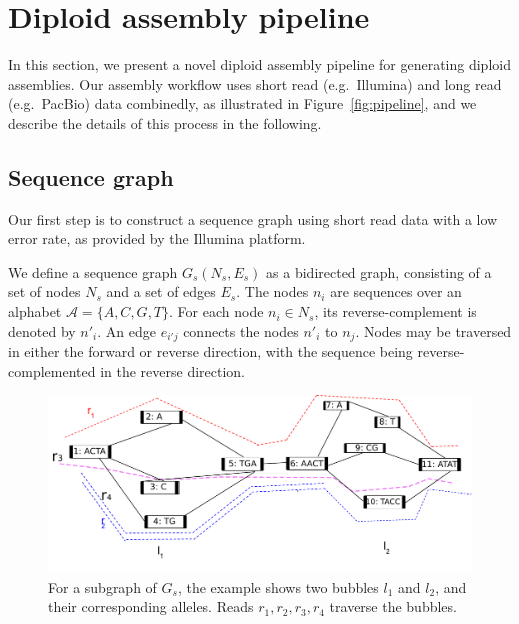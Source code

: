\section{Diploid assembly pipeline}
In this section, we present a novel diploid assembly pipeline for generating diploid assemblies.
Our assembly workflow uses short read (e.g.\ Illumina) and long read (e.g.\ PacBio) data combinedly, as illustrated in Figure~\ref{fig:pipeline}, and we describe the details of this process in the following.

\subsection{Sequence graph} 
Our first step is to construct a sequence graph using short read data with a low error rate, as provided by the Illumina platform.
\begin{definition}
We define a sequence graph $G_s (N_s, E_s)$ as a bidirected graph, consisting of a set of nodes $N_s$ and a set of edges $E_s$.
The nodes $n_i$ are sequences over an alphabet $\mathcal{A} = \{A,C,G,T\}$.
For each node $n_i \in N_s$, its reverse-complement is denoted by $n'_i$.
An edge $e_{i'j}$ connects the nodes $n'_i$ to $n_j$. 
Nodes may be traversed in either the forward or reverse direction, with the sequence being reverse-complemented in the reverse direction. 
\end{definition}

\begin{figure}[t!]\centering
\includegraphics[width=\columnwidth]{wmecfig.pdf}
\caption{For a subgraph of $G_s$, the example shows two bubbles $l_1$ and $l_2$, and their corresponding alleles. Reads $r_1,r_2,r_3,r_4$ traverse the bubbles.}
\label{fig:wmec}
\end{figure}

